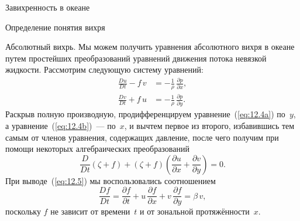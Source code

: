 \begin{chapter}{Завихренность в океане}
\begin{section}{Определение понятия вихря}
\begin{paragraph}{Абсолютный вихрь.}
Мы можем получить уравнения абсолютного вихря в океане путем
простейших преобразований уравнений движения потока невязкой
жидкости. Рассмотрим следующую систему уравнений:
\begin{subequations}
\begin{align}
 \frac{Du}{Dt} -f\,v &= -\frac{1}{\rho}\,\frac{\partial{p}}{\partial{x}},\label{eq:12.4a} \\
 \frac{Dv}{Dt} +f\,u &= -\frac{1}{\rho}\,\frac{\partial{p}}{\partial{y}}.\label{eq:12.4b}
\end{align}
\end{subequations}
Раскрыв полную производную, продифференцируем уравнение~(\ref{eq:12.4a}) 
по~$y$, а уравнение~(\ref{eq:12.4b})~--- по~$x$, и вычтем первое из второго,
избавившись тем самым от членов уравнения, содержащих давление, после
чего получим при помощи некоторых алгебраических преобразований
\begin{equation}\label{eq:12.5}
 \boxed{ \frac{D}{Dt}\left(\zeta + f\right) 
         + \left(\zeta + f\right)\left(\frac{\partial{u}}{\partial{x}} 
         + \frac{\partial{v}}{\partial{y}} \right) = 0. }
\end{equation}
При выводе~(\ref{eq:12.5}) мы воспользовались соотношением
\begin{displaymath}
\frac{Df}{Dt} = 
   \frac{\partial{f}}{\partial{t}}
   + u\,\frac{\partial{f}}{\partial{x}} 
   + v\,\frac{\partial{f}}{\partial{y}} = \beta \,v,
\end{displaymath}
поскольку $f$ не зависит от времени~$t$ и от зональной протяжённости~$x$.
%
\end{paragraph}


\end{section}
\end{chapter}

